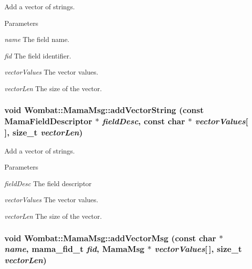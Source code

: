 Add a vector of strings. 
\begin{DoxyParams}{Parameters}
\item[{\em name}]The field name. \item[{\em fid}]The field identifier. \item[{\em vectorValues}]The vector values. \item[{\em vectorLen}]The size of the vector. \end{DoxyParams}
\hypertarget{classWombat_1_1MamaMsg_a9f8de3a5b37ecf6b2b5d328626f020ec}{
\subsubsection[{addVectorString}]{\setlength{\rightskip}{0pt plus 5cm}void Wombat::MamaMsg::addVectorString (const {\bf MamaFieldDescriptor} $\ast$ {\em fieldDesc}, \/  const char $\ast$ {\em vectorValues}\mbox{[}$\,$\mbox{]}, \/  size\_\-t {\em vectorLen})}}
\label{classWombat_1_1MamaMsg_a9f8de3a5b37ecf6b2b5d328626f020ec}


Add a vector of strings. 
\begin{DoxyParams}{Parameters}
\item[{\em fieldDesc}]The field descriptor \item[{\em vectorValues}]The vector values. \item[{\em vectorLen}]The size of the vector. \end{DoxyParams}
\hypertarget{classWombat_1_1MamaMsg_a2d66afc1da9505582e4877441a0fe084}{
\subsubsection[{addVectorMsg}]{\setlength{\rightskip}{0pt plus 5cm}void Wombat::MamaMsg::addVectorMsg (const char $\ast$ {\em name}, \/  mama\_\-fid\_\-t {\em fid}, \/  {\bf MamaMsg} $\ast$ {\em vectorValues}\mbox{[}$\,$\mbox{]}, \/  size\_\-t {\em vectorLen})}}
\label{classWombat_1_1MamaMsg_a2d66afc1da9505582e4877441a0fe084}


